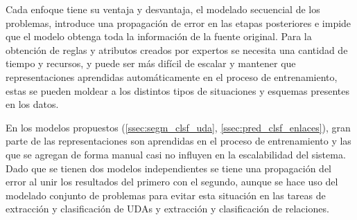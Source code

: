 \documentclass[a4paper,11pt,twocolumn,twoside]{article}
\begin{document}
Cada enfoque tiene su ventaja y desvantaja, el modelado secuencial de los problemas, introduce
una propagación de error en las etapas posteriores e impide que el modelo obtenga toda la información de
la fuente original. Para la obtención de reglas y atributos creados por expertos 
se necesita una cantidad 
de tiempo y recursos, y puede ser más difícil de escalar y mantener que representaciones aprendidas
automáticamente en el proceso de entrenamiento, estas se pueden moldear a los distintos
tipos de situaciones y esquemas presentes en los datos.

En los modelos propuestos (\ref{ssec:segm_clsf_uda}, \ref{ssec:pred_clsf_enlaces}), gran parte de las representaciones son aprendidas en el proceso de 
entrenamiento y las que se agregan de forma manual casi no influyen en la escalabilidad del sistema.
Dado que se tienen dos modelos independientes se tiene una propagación del error al unir los resultados 
del primero con el segundo, aunque se hace uso del modelado conjunto de problemas para evitar esta 
situación en las tareas de extracción y clasificación de UDAs y extracción y clasificación de relaciones.

\end{document}
